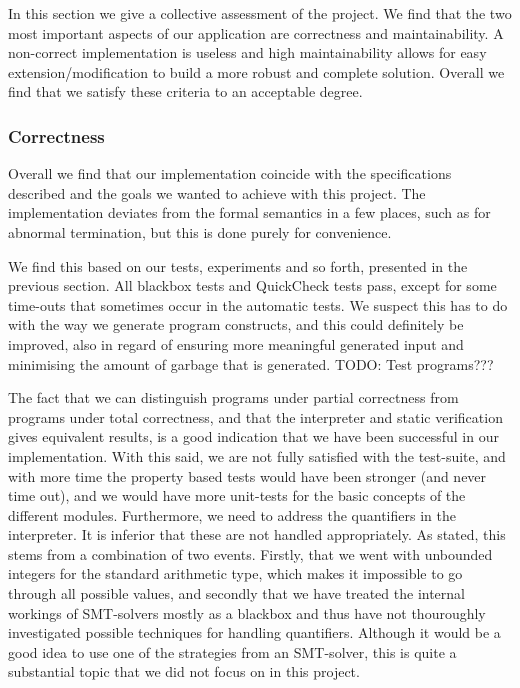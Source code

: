 In this section we give a collective assessment of the project.
We find that the two most important aspects of our application are correctness and maintainability. A non-correct implementation is useless and high maintainability allows for easy extension/modification to build a more robust and complete solution.
Overall we find that we satisfy these criteria to an acceptable degree.

\subsubsection{Correctness}
Overall we find that our implementation coincide with the specifications described and the goals we wanted to achieve with this project.
The implementation deviates from the formal semantics in a few places, such as for abnormal termination, but this is done purely for convenience.

We find this based on our tests, experiments and so forth, presented in the previous section.
All blackbox tests and QuickCheck tests pass, except for some time-outs that sometimes occur in the automatic tests. We suspect this has to do with the way we generate program constructs, and this could definitely be improved, also in regard of ensuring more meaningful generated input and minimising the amount of garbage that is generated.
TODO: Test programs???

The fact that we can distinguish programs under partial correctness from programs under total correctness, and that the interpreter and static verification gives equivalent results, is a good indication that we have been successful in our implementation.
With this said, we are not fully satisfied with the test-suite, and with more time the property based tests would have been stronger (and never time out), and we would have more unit-tests for the basic concepts of the different modules.
Furthermore, we need to address the quantifiers in the interpreter.
It is inferior that these are not handled appropriately.
As stated, this stems from a combination of two events.
Firstly, that we went with unbounded integers for the standard arithmetic type, which makes it impossible to go through all possible values, and secondly that we have treated the internal workings of SMT-solvers mostly as a blackbox and thus have not thouroughly investigated possible techniques for handling quantifiers. 
Although it would be a good idea to use one of the strategies from an SMT-solver, this is quite a substantial topic that we did not focus on in this project.

